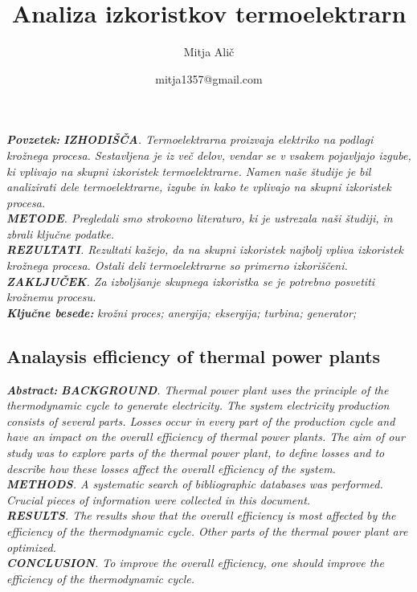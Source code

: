 \documentclass[a4paper,10pt]{article}
\title{\bf{Analiza izkoristkov termoelektrarn}}
\author{Mitja Alič}
\affil{Fakulteta za elektrotehniko, Univeraza v Ljubljani}
\date{\vspace{-3ex} mitja1357@gmail.com}
\begin{document}
\maketitle
\noindent
\textbf{\textit{Povzetek:}} {\it \textbf{IZHODIŠČA}. Termoelektrarna proizvaja elektriko na podlagi krožnega procesa. Sestavljena je iz več delov, vendar se v vsakem pojavljajo izgube, ki vplivajo na skupni izkoristek termoelektrarne. Namen naše študije je bil analizirati dele termoelektrarne, izgube in kako te vplivajo na skupni izkoristek procesa.\\
	\textbf{METODE}. Pregledali smo strokovno literaturo, ki je ustrezala naši študiji, in zbrali ključne podatke.\\
\textbf{REZULTATI}. Rezultati kažejo, da na skupni izkoristek najbolj vpliva izkoristek krožnega procesa. Ostali deli termoelektrarne so primerno izkoriščeni.\\
	\textbf{ZAKLJUČEK}. Za izboljšanje skupnega izkoristka se je potrebno posvetiti krožnemu procesu.
}
\\
\noindent	
\textbf{\textit{Klju\v cne besede:}} {\it krožni proces; anergija; eksergija; turbina; generator;}
\begin{center}
	\subsection*{ \bf Analaysis efficiency of thermal power plants} 
\end{center}
\noindent
\textbf{\textit{Abstract:}} {\it \textbf{BACKGROUND}. Thermal power plant uses the principle of the thermodynamic cycle to generate electricity. The system electricity production consists of several parts. Losses occur in every part of the production cycle and have an impact on the overall efficiency of thermal power plants. The aim of our study was to explore parts of the thermal power plant, to define losses and to describe how these losses affect the overall efficiency of the system. \\
	\textbf{METHODS}. A systematic search of bibliographic databases was performed. Crucial pieces of information were collected in this document. \\
	\textbf{RESULTS}. The results show that the overall efficiency is most affected by the efficiency of the thermodynamic cycle. Other parts of the thermal power plant are optimized. \\
	\textbf{CONCLUSION}. To improve the overall efficiency, one should improve the efficiency of the thermodynamic cycle.
}
\end{document}
